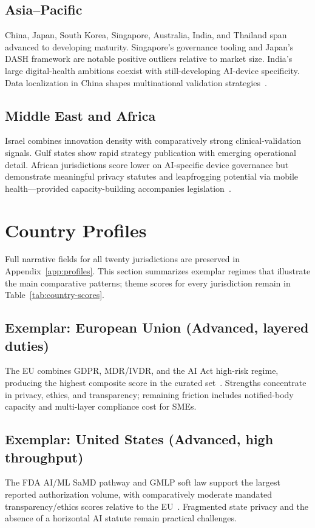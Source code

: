 \subsection{Asia--Pacific}
China, Japan, South Korea, Singapore, Australia, India, and Thailand span advanced to developing maturity. Singapore's governance tooling and Japan's DASH framework are notable positive outliers relative to market size. India's large digital-health ambitions coexist with still-developing AI-device specificity. Data localization in China shapes multinational validation strategies~\cite{nmpa2021}.

\subsection{Middle East and Africa}
Israel combines innovation density with comparatively strong clinical-validation signals. Gulf states show rapid strategy publication with emerging operational detail. African jurisdictions score lower on AI-specific device governance but demonstrate meaningful privacy statutes and leapfrogging potential via mobile health---provided capacity-building accompanies legislation~\cite{who2021}.

\section{Country Profiles}
\label{sec:profiles}

Full narrative fields for all twenty jurisdictions are preserved in Appendix~\ref{app:profiles}. This section summarizes exemplar regimes that illustrate the main comparative patterns; theme scores for every jurisdiction remain in Table~\ref{tab:country-scores}.

\subsection{Exemplar: European Union (Advanced, layered duties)}
The EU combines GDPR, MDR/IVDR, and the AI Act high-risk regime, producing the highest composite score in the curated set~\cite{euaiact2024}. Strengths concentrate in privacy, ethics, and transparency; remaining friction includes notified-body capacity and multi-layer compliance cost for SMEs.

\subsection{Exemplar: United States (Advanced, high throughput)}
The FDA AI/ML SaMD pathway and GMLP soft law support the largest reported authorization volume, with comparatively moderate mandated transparency/ethics scores relative to the EU~\cite{fda2021,wu2021}. Fragmented state privacy and the absence of a horizontal AI statute remain practical challenges.

